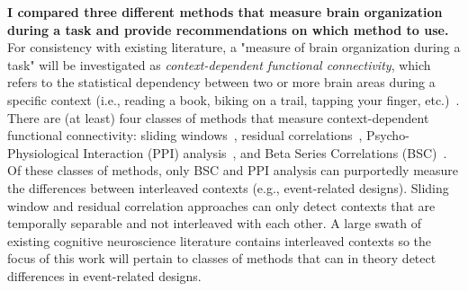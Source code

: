 \documentclass[phd,appendix,figures]{uithesis}
\begin{document}
\textbf{I compared three different methods that measure brain organization during a task
and provide recommendations on which method to use.}
For consistency with existing literature, a "measure of brain organization during a task" will be
investigated as \textit{context-dependent functional connectivity}, which refers to
the statistical dependency between two or more brain areas during a specific context
(i.e., reading a book, biking on a trail, tapping your finger, etc.)~\cite{Friston1997}.
There are (at least) four classes of methods that measure context-dependent functional connectivity:
sliding windows~\cite{Shine2015}, residual correlations~\cite{Cole2014a},
Psycho-Physiological Interaction (PPI) analysis~\cite{Friston1997}, and Beta Series Correlations (BSC)~\cite{Rissman2004}.
Of these classes of methods, only BSC and PPI analysis can purportedly measure the differences
between interleaved contexts (e.g., event-related designs).
Sliding window and residual correlation approaches can only detect contexts that are
temporally separable and not interleaved with each other.
A large swath of existing cognitive neuroscience literature contains interleaved
contexts so the focus of this work will pertain to classes of methods
that can in theory detect differences in event-related designs.
\end{document}

